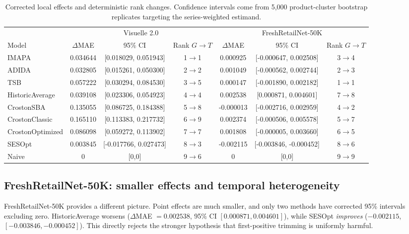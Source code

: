 \begin{table}[t]
\centering
\caption{Corrected local effects and deterministic rank changes. Confidence intervals come from 5,000 product-cluster bootstrap replicates targeting the series-weighted estimand.}
\label{tab:local}
\scriptsize
\begin{tabular}{lccc ccc}
\toprule
& \multicolumn{3}{c}{Visuelle 2.0} & \multicolumn{3}{c}{FreshRetailNet-50K} \\
\cmidrule(lr){2-4}\cmidrule(lr){5-7}
Model & $\Delta$MAE & 95\% CI & Rank $G\rightarrow T$ & $\Delta$MAE & 95\% CI & Rank $G\rightarrow T$\\
\midrule
IMAPA & 0.034644 & [0.018029, 0.051943] & 1$\rightarrow$1 & 0.000925 & [-0.000647, 0.002508] & 3$\rightarrow$4 \\
ADIDA & 0.032805 & [0.015261, 0.050300] & 2$\rightarrow$2 & 0.001049 & [-0.000562, 0.002744] & 2$\rightarrow$3 \\
TSB & 0.057222 & [0.030294, 0.084530] & 3$\rightarrow$5 & 0.000147 & [-0.001890, 0.002182] & 1$\rightarrow$1 \\
HistoricAverage & 0.039108 & [0.023306, 0.054923] & 4$\rightarrow$4 & 0.002538 & [0.000871, 0.004601] & 7$\rightarrow$8 \\
CrostonSBA & 0.135055 & [0.086725, 0.184388] & 5$\rightarrow$8 & -0.000013 & [-0.002716, 0.002959] & 4$\rightarrow$2 \\
CrostonClassic & 0.165110 & [0.113383, 0.217732] & 6$\rightarrow$9 & 0.002374 & [-0.000506, 0.005578] & 5$\rightarrow$7 \\
CrostonOptimized & 0.086098 & [0.059272, 0.113902] & 7$\rightarrow$7 & 0.001808 & [-0.000005, 0.003660] & 6$\rightarrow$5 \\
SESOpt & 0.003845 & [-0.017766, 0.027473] & 8$\rightarrow$3 & -0.002115 & [-0.003846, -0.000452] & 8$\rightarrow$6 \\
Naive & 0 & [0,0] & 9$\rightarrow$6 & 0 & [0,0] & 9$\rightarrow$9 \\
\bottomrule
\end{tabular}
\end{table}

\subsection{FreshRetailNet-50K: smaller effects and temporal heterogeneity}

FreshRetailNet-50K provides a different picture. Point effects are much smaller, and only two methods have corrected 95\% intervals excluding zero. HistoricAverage worsens ($\Delta$MAE $=0.002538$, 95\% CI $[0.000871,0.004601]$), while SESOpt \emph{improves} ($-0.002115$, $[-0.003846,-0.000452]$). This directly rejects the stronger hypothesis that first-positive trimming is uniformly harmful.

